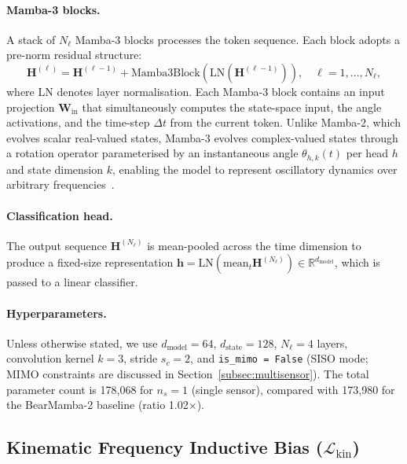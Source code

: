 \paragraph{Mamba-3 blocks.}
A stack of $N_{\ell}$ Mamba-3 blocks processes the token sequence.
Each block adopts a pre-norm residual structure:
\begin{equation}
  \mathbf{H}^{(\ell)} = \mathbf{H}^{(\ell-1)}
    + \text{Mamba3Block}\!\left(\text{LN}(\mathbf{H}^{(\ell-1)})\right),
  \quad \ell = 1, \ldots, N_\ell,
  \label{eq:prenorm}
\end{equation}
where LN denotes layer normalisation.
Each Mamba-3 block contains an input projection $\mathbf{W}_{\text{in}}$
that simultaneously computes the state-space input, the angle activations,
and the time-step $\Delta t$ from the current token.
Unlike Mamba-2, which evolves scalar real-valued states, Mamba-3 evolves
complex-valued states through a rotation operator parameterised by an
instantaneous angle $\theta_{h,k}(t)$ per head $h$ and state dimension $k$,
enabling the model to represent oscillatory dynamics over arbitrary
frequencies~\cite{mamba3_2026}.

\paragraph{Classification head.}
The output sequence $\mathbf{H}^{(N_\ell)}$ is mean-pooled across the time
dimension to produce a fixed-size representation
$\mathbf{h} = \text{LN}\!\left(\text{mean}_t \mathbf{H}^{(N_\ell)}\right) \in \mathbb{R}^{d_{\text{model}}}$,
which is passed to a linear classifier.

\paragraph{Hyperparameters.}
Unless otherwise stated, we use $d_{\text{model}} = 64$, $d_{\text{state}} = 128$,
$N_\ell = 4$ layers, convolution kernel $k = 3$, stride $s_c = 2$, and
\texttt{is\_mimo = False} (SISO mode; MIMO constraints are discussed in
Section~\ref{subsec:multisensor}).
The total parameter count is 178,068 for $n_s = 1$ (single sensor), compared
with 173,980 for the BearMamba-2 baseline (ratio 1.02$\times$).



\subsection{Kinematic Frequency Inductive Bias ($\mathcal{L}_{\text{kin}}$)}
\label{subsec:lkin}

